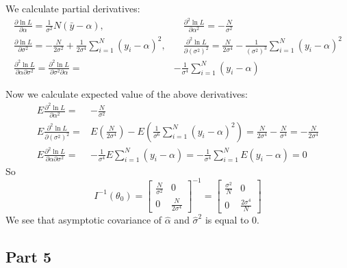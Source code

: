 \documentclass[12pt, a4paper]{article}\usepackage[]{graphicx}\usepackage[]{color}
\begin{document}
We calculate partial derivatives:
\begin{align*}
\frac{\partial\ln{L}}{\partial\alpha}=\frac{1}{\sigma^2}N(\bar{y}-\alpha), & \quad \frac{\partial^{2}\ln{L}}{\partial\alpha^{2}}=-\frac{N}{\sigma^{2}} \\
\frac{\partial\ln{L}}{\partial\sigma^{2}}=-\frac{N}{2\sigma^{2}}+\frac{1}{2\sigma^{4}}\sum_{i=1}^{N}(y_{i}-\alpha)^{2}, & \quad
  \frac{\partial^{2}\ln{L}}{\partial(\sigma^{2})^{2}}=\frac{N}{2\sigma^{4}}-\frac{1}{(\sigma^{2})^{3}}\sum_{i=1}^{N}(y_{i}-\alpha)^2 \\
\frac{\partial^{2}\ln{L}}{\partial\alpha\partial\sigma^{2}} =\frac{\partial^{2}\ln{L}}{\partial\sigma^{2}\partial\alpha}=&-\frac{1}{\sigma^{4}}\sum_{i=1}^{N}(y_{i}-\alpha)
\end{align*}

Now we calculate expected value of the above derivatives:
\begin{align*}
E\frac{\partial^{2}\ln{L}}{\partial\alpha^{2}}=&-\frac{N}{\sigma^{2}} \\
%
E\frac{\partial^{2}\ln{L}}{\partial(\sigma^{2})^{2}}=&E\left(\frac{N}{2\sigma^{4}}\right)-E\left(\frac{1}{\sigma^{6}}\sum_{i=1}^{N}(y_{i}-\alpha)^{2}\right)=\frac{N}{2\sigma^{4}}-\frac{N}{\sigma^{4}}=-\frac{N}{2\sigma^{4}}\\
%
E\frac{\partial^{2}\ln{L}}{\partial\alpha\partial\sigma^{2}}=&-\frac{1}{\sigma^{4}}E\sum_{i=1}^{N}(y_{i}-\alpha)=-\frac{1}{\sigma^{4}}\sum_{i=1}^{N}E(y_{i}-\alpha)=0
\end{align*}
So 
\[
I^{-1}(\theta_{0})=
\begin{bmatrix}  
    \frac{N}{\sigma^{2}} & 0\\
    0 & \frac{N}{2\sigma^{4}}
  \end{bmatrix}^{-1}=
	\begin{bmatrix}  
    \frac{\sigma^{2}}{N} & 0\\
    0 & \frac{2\sigma^{4}}{N}
  \end{bmatrix}
\]
We see that asymptotic covariance of $\hat{\alpha}$ and $\hat{\sigma}^{2}$ is equal to 0.




\subsection{Part 5}
\end{document}
